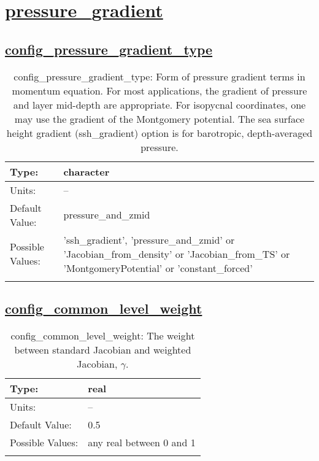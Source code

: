 \section[pressure\_gradient]{\hyperref[sec:nm_tab_pressure_gradient]{pressure\_gradient}}
\label{sec:nm_sec_pressure_gradient}
\subsection[config\_pressure\_gradient\_type]{\hyperref[sec:nm_tab_pressure_gradient]{config\_pressure\_gradient\_type}}
\label{subsec:nm_sec_config_pressure_gradient_type}
\begin{center}
\begin{longtable}{| p{2.0in} || p{4.0in} |}
    \hline
    Type: & character \\
    \hline
    Units: & -- \\
    \hline
    Default Value: & pressure\_and\_zmid \\
    \hline
    Possible Values: & 'ssh\_gradient', 'pressure\_and\_zmid' or 'Jacobian\_from\_density' or 'Jacobian\_from\_TS' or 'MontgomeryPotential' or 'constant\_forced' \\
    \hline
    \caption{config\_pressure\_gradient\_type: Form of pressure gradient terms in momentum equation. For most applications, the gradient of pressure and layer mid-depth are appropriate.  For isopycnal coordinates, one may use the gradient of the Montgomery potential.  The sea surface height gradient (ssh\_gradient) option is for barotropic, depth-averaged pressure.}
\end{longtable}
\end{center}
\subsection[config\_common\_level\_weight]{\hyperref[sec:nm_tab_pressure_gradient]{config\_common\_level\_weight}}
\label{subsec:nm_sec_config_common_level_weight}
\begin{center}
\begin{longtable}{| p{2.0in} || p{4.0in} |}
    \hline
    Type: & real \\
    \hline
    Units: & -- \\
    \hline
    Default Value: & 0.5 \\
    \hline
    Possible Values: & any real between 0 and 1 \\
    \hline
    \caption{config\_common\_level\_weight: The weight between standard Jacobian and weighted Jacobian, $\gamma$.}
\end{longtable}
\end{center}
